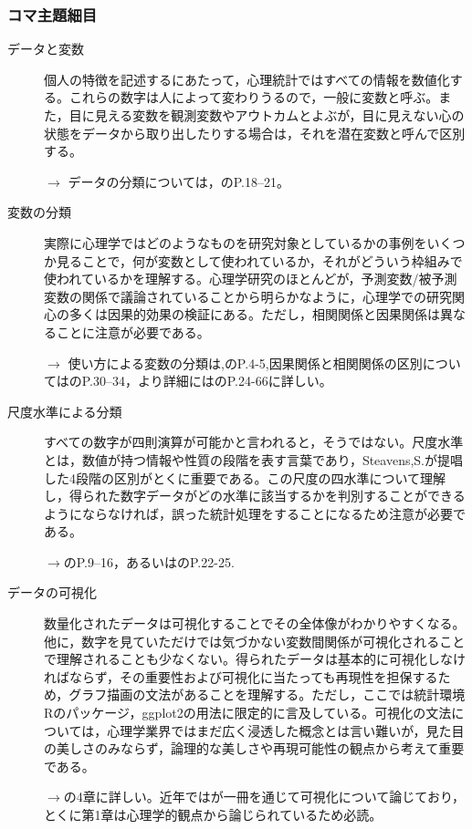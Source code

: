 \subsubsection{コマ主題細目}
\begin{description}
	\item[データと変数] 個人の特徴を記述するにあたって，心理統計ではすべての情報を数値化する。これらの数字は人によって変わりうるので，一般に変数と呼ぶ。また，目に見える変数を観測変数やアウトカムとよぶが，目に見えない心の状態をデータから取り出したりする場合は，それを潜在変数と呼んで区別する。
	      \begin{flushright}
		      $\to$ データの分類については，\textcite{Yamada2004}のP.18--21。
	      \end{flushright}

	\item[変数の分類] 実際に心理学ではどのようなものを研究対象としているかの事例をいくつか見ることで，何が変数として使われているか，それがどういう枠組みで使われているかを理解する。心理学研究のほとんどが，予測変数/被予測変数の関係で議論されていることから明らかなように，心理学での研究関心の多くは因果的効果の検証にある。ただし，相関関係と因果関係は異なることに注意が必要である。
	      \begin{flushright}
		      $\to$ 使い方による変数の分類は,\textcite{Yamauchi201001}のP.4-5,因果関係と相関関係の区別については\textcite{Miura201705}のP.30--34，より詳細には\textcite{Toyoda1992}のP.24-66に詳しい。
	      \end{flushright}

	\item[尺度水準による分類] すべての数字が四則演算が可能かと言われると，そうではない。尺度水準とは，数値が持つ情報や性質の段階を表す言葉であり，Steavens,S.が提唱した4段階の区別がとくに重要である。この尺度の四水準について理解し，得られた数字データがどの水準に該当するかを判別することができるようにならなければ，誤った統計処理をすることになるため注意が必要である。
	      \begin{flushright}
		      $\to$\textcite{Kawabata201408}のP.9--16，あるいは\textcite{Yamada2004}のP.22-25.
	      \end{flushright}

	\item[データの可視化] 数量化されたデータは可視化することでその全体像がわかりやすくなる。他に，数字を見ていただけでは気づかない変数間関係が可視化されることで理解されることも少なくない。得られたデータは基本的に可視化しなければならず，その重要性および可視化に当たっても再現性を担保するため，グラフ描画の文法があることを理解する。ただし，ここでは統計環境Rのパッケージ，ggplot2の用法に限定的に言及している。可視化の文法については，心理学業界ではまだ広く浸透した概念とは言い難いが，見た目の美しさのみならず，論理的な美しさや再現可能性の観点から考えて重要である。
	      \begin{flushright}
		      $\to$\textcite{Kinosady2021}の4章に詳しい。近年では\textcite{Kieran2018}が一冊を通じて可視化について論じており，とくに第1章は心理学的観点から論じられているため必読。
	      \end{flushright}


\end{description}
